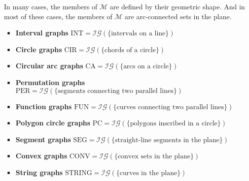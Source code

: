 In many cases, the members of $\mathcal{M}$ are defined by their geometric shape. And in most of these cases, the members of $\mathcal{M}$ are arc-connected sets in the plane.

\begin{itemize}
	\item \textbf{Interval graphs} $\text{INT} = \mathcal{IG}(\{\text{intervals on a line}\})$
	\item \textbf{Circle graphs} $\text{CIR} = \mathcal{IG}(\{\text{chords of a circle}\})$
	\item \textbf{Circular arc graphs} $\text{CA} = \mathcal{IG}(\{\text{arcs on a circle}\})$
	\item \textbf{Permutation graphs} $\text{PER} = \mathcal{IG}(\{\text{segments connecting two parallel lines}\})$
	\item \textbf{Function graphs} $\text{FUN} = \mathcal{IG}(\{\text{curves connecting two parallel lines}\})$
	\item \textbf{Polygon circle graphs} $\text{PC} = \mathcal{IG}(\{\text{polygons inscribed in a circle}\})$
	\item \textbf{Segment graphs} $\text{SEG} = \mathcal{IG}(\{\text{straight-line segments in the plane}\})$
	\item \textbf{Convex graphs} $\text{CONV} = \mathcal{IG}(\{\text{convex sets in the plane}\})$
	\item \textbf{String graphs} $\text{STRING} = \mathcal{IG}(\{\text{curves in the plane}\})$
\end{itemize}

